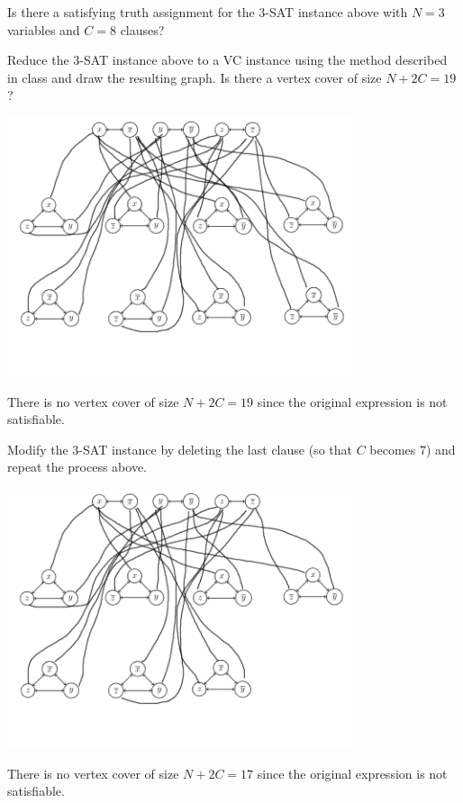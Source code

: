 \documentclass[12pt]{article}
\begin{document}
\begin{flushleft}
   Is there a satisfying truth assignment for the 3-SAT instance above with
$N = 3$ variables and $C = 8$ clauses?

   \vspace*{0.5in}

   Reduce the 3-SAT instance above to a VC instance using the method described in class and draw the resulting graph.
Is there a vertex cover of size $N+2C = 19$? 

\begin{center}
   \includegraphics[width=4in]{vertexcover.png}
\end{center}
There is no vertex cover of size $N+2C = 19$ since the original expression is not satisfiable.

\pagebreak
Modify the 3-SAT instance by deleting the last clause (so that $C$ becomes 7)
and repeat the process above. 

\begin{center}
   \includegraphics[width=4in]{vertexcover2.png}
\end{center}
There is no vertex cover of size $N+2C = 17$ since the original expression is not satisfiable.

\end{flushleft}
\end{document}
